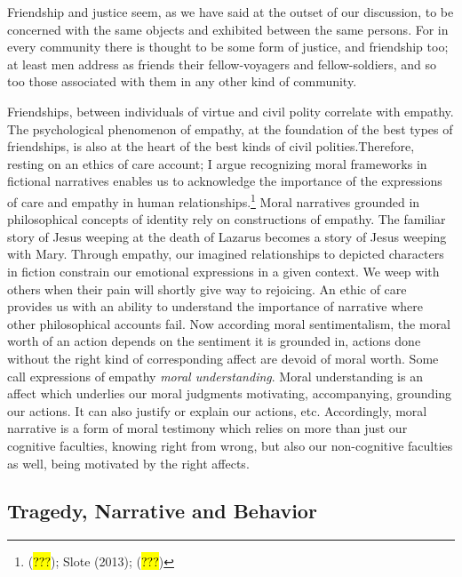 \documentclass[
  letterpaper,
  DIV=11,
  numbers=noendperiod]{scrartcl}
\theoremstyle{remark}
\begin{document}
Friendship and justice seem, as we have said at the outset of our
discussion, to be concerned with the same objects and exhibited between
the same persons. For in every community there is thought to be some
form of justice, and friendship too; at least men address as friends
their fellow-voyagers and fellow-soldiers, and so too those associated
with them in any other kind of community.

Friendships, between individuals of virtue and civil polity correlate
with empathy. The psychological phenomenon of empathy, at the foundation
of the best types of friendships, is also at the heart of the best kinds
of civil polities.Therefore, resting on an ethics of care account; I
argue recognizing moral frameworks in fictional narratives enables us to
acknowledge the importance of the expressions of care and empathy in
human relationships.\footnote{(\hl{???}); Slote (2013); (\hl{???})}
Moral narratives grounded in philosophical concepts of identity rely on
constructions of empathy. The familiar story of Jesus weeping at the
death of Lazarus becomes a story of Jesus weeping with Mary. Through
empathy, our imagined relationships to depicted characters in fiction
constrain our emotional expressions in a given context. We weep with
others when their pain will shortly give way to rejoicing. An ethic of
care provides us with an ability to understand the importance of
narrative where other philosophical accounts fail. Now according moral
sentimentalism, the moral worth of an action depends on the sentiment it
is grounded in, actions done without the right kind of corresponding
affect are devoid of moral worth. Some call expressions of empathy
\emph{moral understanding}. Moral understanding is an affect which
underlies our moral judgments motivating, accompanying, grounding our
actions. It can also justify or explain our actions, etc. Accordingly,
moral narrative is a form of moral testimony which relies on more than
just our cognitive faculties, knowing right from wrong, but also our
non-cognitive faculties as well, being motivated by the right affects.

\subsection{Tragedy, Narrative and
Behavior}\label{tragedy-narrative-and-behavior}
\end{document}
